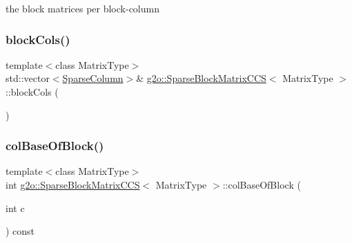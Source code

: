 the block matrices per block-\/column 

\mbox{\label{classg2o_1_1_sparse_block_matrix_c_c_s_a5a9ef3cd8399a335edec8b7e934192b8}} 
\subsubsection{\texorpdfstring{block\+Cols()}{blockCols()}\hspace{0.1cm}{\footnotesize\ttfamily [2/2]}}
{\footnotesize\ttfamily template$<$class Matrix\+Type$>$ \\
std\+::vector$<$\mbox{\hyperlink{classg2o_1_1_sparse_block_matrix_c_c_s_a4fc5dfe0a9ff9bd62065ca4b17f25bc1}{Sparse\+Column}}$>$\& \mbox{\hyperlink{classg2o_1_1_sparse_block_matrix_c_c_s}{g2o\+::\+Sparse\+Block\+Matrix\+C\+CS}}$<$ Matrix\+Type $>$\+::block\+Cols (\begin{DoxyParamCaption}{ }\end{DoxyParamCaption})\hspace{0.3cm}{\ttfamily [inline]}}

\mbox{\label{classg2o_1_1_sparse_block_matrix_c_c_s_a6b25e7158b6d546920161db15d279d67}} 
\subsubsection{\texorpdfstring{col\+Base\+Of\+Block()}{colBaseOfBlock()}}
{\footnotesize\ttfamily template$<$class Matrix\+Type$>$ \\
int \mbox{\hyperlink{classg2o_1_1_sparse_block_matrix_c_c_s}{g2o\+::\+Sparse\+Block\+Matrix\+C\+CS}}$<$ Matrix\+Type $>$\+::col\+Base\+Of\+Block (\begin{DoxyParamCaption}\item[{int}]{c }\end{DoxyParamCaption}) const\hspace{0.3cm}{\ttfamily [inline]}}



